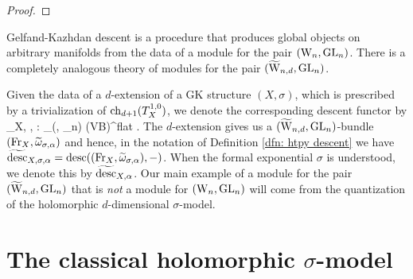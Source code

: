 \documentclass[10pt]{amsart}
\begin{document}
\begin{proof}
\end{proof}

Gelfand-Kazhdan descent is a procedure that produces global objects on arbitrary manifolds from the data of a module for the pair $({{\rm W}_n}, {\rm GL}_n)$. 
There is a completely analogous theory of modules for the pair $(\widetilde{\rm W}_{n,d}, {\rm GL}_n)$. 

Given the data of a $d$-extension of a GK structure $(X, \sigma)$, which is prescribed by a trivialization of ${\rm ch}_{d+1}(T_X^{1,0})$, we denote the corresponding descent functor by
\ben
\Tilde{\desc}_{X, \sigma, \alpha} : \Mod_{(\TVectd, \GL_n)} (VB)^{flat} .
\een
The $d$-extension gives us a $(\widetilde{\rm W}_{n,d},{\rm GL}_n)$-bundle $({\rm Fr}_X, \widetilde{\omega}_{\sigma,\alpha})$ and hence, in the notation of Definition \ref{dfn: htpy descent} we have $\widetilde{{\rm desc}}_{X, \sigma, \alpha} = {\rm desc}(({\rm Fr}_X, \widetilde{\omega}_{\sigma, \alpha}), -)$.
When the formal exponential $\sigma$ is understood, we denote this by $\widetilde{{\rm desc}}_{X,\alpha}$. 
Our main example of a module for the pair $(\widetilde{\rm W}_{n,d}, {\rm GL}_n)$ that is {\em not} a module for $({{\rm W}_n}, {\rm GL}_n)$ will come from the quantization of the holomorphic $d$-dimensional $\sigma$-model.

\section{The classical holomorphic $\sigma$-model}
\end{document}
